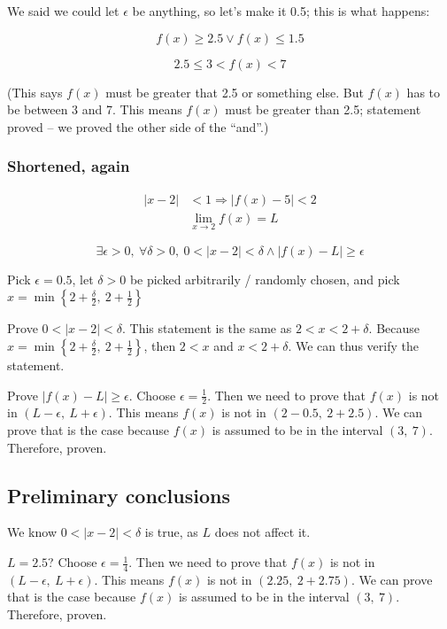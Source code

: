 \documentclass[12pt]{article}
\theoremstyle{plain}
\theoremstyle{remark}
\theoremstyle{definition}
\begin{document}
We said we could let \(\epsilon\) be anything, so let's make it 0.5;
this is what happens:

\[f(x) \geq 2.5 \vee f(x) \leq 1.5\]

\[2.5 \leq 3 < f(x) < 7\]

(This says \(f(x)\) must be greater that 2.5 or something else. But
\(f(x)\) has to be between 3 and 7. This means \(f(x)\) must be greater
than 2.5; statement proved -- we proved the other side of the ``and''.)


\subsubsection{Shortened, again}

\begin{align*}
|x - 2| &< 1 \Rightarrow \left| f(x) - 5 \right| < 2 \\
&\lim_{x \rightarrow 2}{f(x) = L}
\end{align*}


\[\exists\epsilon > 0,\ \forall\delta > 0,\ 0 < |x - 2| < \delta \land \left| f(x) - L \right| \geq \epsilon\]

Pick \(\epsilon = 0.5\), let \(\delta > 0\) be picked arbitrarily /
randomly chosen, and pick
\(x = \min\left\{ 2 + \frac{\delta}{2},\ 2 + \frac{1}{2} \right\}\)

Prove \(0 < |x - 2| < \delta\). This statement is the same as
\(2 < x < 2 + \delta\). Because
\(x = \min\left\{ 2 + \frac{\delta}{2},\ 2 + \frac{1}{2} \right\}\),
then \(2 < x\) and \(x < 2 + \delta\). We can thus verify the statement.

Prove \(\left| f(x) - L \right| \geq \epsilon\). Choose
\(\epsilon = \frac{1}{2}\). Then we need to prove that \(f(x)\) is not
in \((L - \epsilon,\ L + \epsilon)\). This means \(f(x)\) is not in
\((2 - 0.5,\ 2 + 2.5)\). We can prove that is the case because \(f(x)\)
is assumed to be in the interval \((3,\ 7)\). Therefore, proven.


\subsection{Preliminary conclusions}

We know \(0 < |x - 2| < \delta\) is true, as \(L\) does not affect it.

\(L = 2.5\)? Choose \(\epsilon = \frac{1}{4}\). Then we need to prove
that \(f(x)\) is not in \((L - \epsilon,\ L + \epsilon)\). This means
\(f(x)\) is not in \((2.25,\ 2 + 2.75)\). We can prove that is the case
because \(f(x)\) is assumed to be in the interval \((3,\ 7)\).
Therefore, proven.
\end{document}
